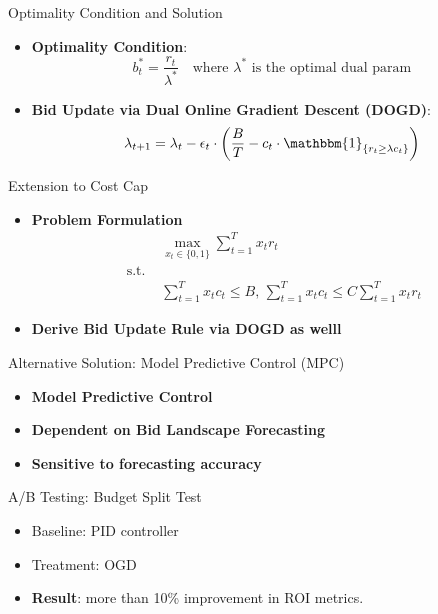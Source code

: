 \documentclass{beamer}
\begin{document}
	\begin{frame}{Optimality Condition and Solution}
		\begin{itemize}
			\item \textbf{Optimality Condition}:
			\[
			b_t^* = \frac{r_t}{\lambda^*}   \quad \text{where }  \lambda^* \text{ is the optimal dual param}
			\]
			\item \textbf{Bid Update via Dual Online Gradient Descent (DOGD)}:
			\[
			\lambda_{t+1} = \lambda_t - \epsilon_t \cdot \left( \frac{B}{T} - c_t \cdot \mathbbm{1}_{\{r_t \geq \lambda c_t\} }\right)
			\]
		\end{itemize}
	\end{frame}


	\begin{frame}{Extension to Cost Cap}
		\begin{itemize}
			\item \textbf{Problem Formulation}
			\begin{align*}
						& \max_{x_t \in  \{0, 1 \}}  \sum_{t=1}^T x_t r_t 
						 \\  \text{ s.t. }  &  
						 \\  &\sum_{t=1}^T x_t c_t \leq B \text{, } \sum_{t=1}^T x_t c_t \leq C \sum_{t=1}^T x_t r_t
			\end{align*}
			
			
			\item \textbf{Derive Bid Update Rule via DOGD as welll}
		
			
		\end{itemize}
		
	\end{frame}
	
	
	\begin{frame}{Alternative Solution: Model Predictive Control (MPC)}
		\begin{itemize}
			\item \textbf{Model Predictive Control}
			\item \textbf{Dependent on Bid Landscape Forecasting} 
			\item \textbf{Sensitive to forecasting accuracy}

		\end{itemize}
	\end{frame}
	
	\begin{frame}{A/B Testing: Budget Split Test}
		\begin{itemize}
			\item Baseline: PID controller
			\item Treatment: OGD
			\item \textbf{Result}:  more than 10\% improvement in ROI metrics.
		\end{itemize}
	\end{frame}
	
\end{document}
